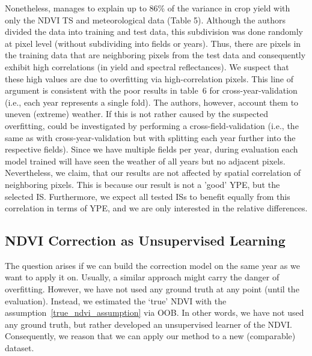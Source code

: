 {{        Nonetheless, \cite{perichPixelbasedCropYield2022} manages to explain up to 86\% of the variance in crop yield with only the NDVI TS and meteorological data (Table 5).  Although the authors divided the data into training and test data, this subdivision was done randomly at pixel level (without subdividing into fields or years). Thus, there are pixels in the training data that are neighboring pixels from the test data and consequently exhibit high correlations (in yield and spectral reflectances). We suspect that these high values are due to overfitting via high-correlation pixels. This line of argument is consistent with the poor results in table~6 for cross-year-validation (i.e., each year represents a single fold). The authors, however, account them to uneven (extreme) weather.  If this is not rather caused by the suspected overfitting, could be investigated by performing a cross-field-validation (i.e., the same as with cross-year-validation but with splitting each year further into the respective fields). Since we have multiple fields per year, during evaluation each model trained will have seen the weather of all years but no adjacent pixels.%
        Nevertheless, we claim, that our results are not affected by spatial correlation of neighboring pixels. This is because our result is not a 'good' YPE, but the selected IS. Furthermore, we expect all tested ISs to benefit equally from this correlation in terms of YPE, and we are only interested in the relative differences.  
    }

    \subsection{NDVI Correction as Unsupervised Learning}
        The question arises if we can build the correction model on the same year as we want to apply it on. Usually, a similar approach might carry the danger of overfitting. However, we have not used any ground truth at any point (until the evaluation). Instead, we estimated the `true' NDVI with the assumption~\ref{true_ndvi_assumption} via OOB. In other words, we have not used any ground truth, but rather developed an unsupervised learner of the NDVI. Consequently, we reason that we can apply our method to a new (comparable) dataset.
}
